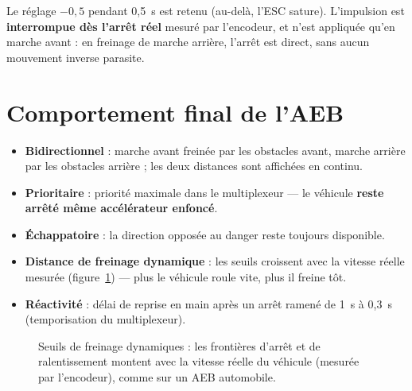 \documentclass[11pt,a4paper]{article}
\begin{document}
Le réglage $-0{,}5$ pendant 0,5~s est retenu (au-delà, l'ESC sature). L'impulsion est
\textbf{interrompue dès l'arrêt réel} mesuré par l'encodeur, et n'est appliquée qu'en
marche avant : en freinage de marche arrière, l'arrêt est direct, sans aucun
mouvement inverse parasite.

\section{Comportement final de l'AEB}
\begin{itemize}[leftmargin=1.4em,itemsep=2pt]
  \item \textbf{Bidirectionnel} : marche avant freinée par les obstacles avant,
        marche arrière par les obstacles arrière ; les deux distances sont affichées
        en continu.
  \item \textbf{Prioritaire} : priorité maximale dans le multiplexeur — le véhicule
        \textbf{reste arrêté même accélérateur enfoncé}.
  \item \textbf{Échappatoire} : la direction opposée au danger reste toujours
        disponible.
  \item \textbf{Distance de freinage dynamique} : les seuils croissent avec la
        vitesse réelle mesurée (figure~\ref{fig:seuils}) — plus le véhicule roule
        vite, plus il freine tôt.
  \item \textbf{Réactivité} : délai de reprise en main après un arrêt ramené de 1~s
        à 0,3~s (temporisation du multiplexeur).
\end{itemize}

\begin{figure}[h]
\centering
{}
\caption{Seuils de freinage dynamiques : les frontières d'arrêt et de ralentissement
montent avec la vitesse réelle du véhicule (mesurée par l'encodeur), comme sur un AEB
automobile.}
\label{fig:seuils}
\end{figure}
\end{document}
